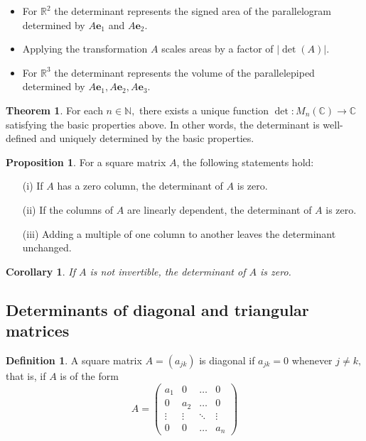 \documentclass[12pt, a4paper]{article}
\theoremstyle{definition}
\newtheorem{definition}{Definition}[section]
\newtheorem{theorem}{Theorem}[section]
\newtheorem{proposition}{Proposition}
\theoremstyle{plain}
\newtheorem{corollary}{Corollary}[theorem]
\newcommand{\bb}[1]{\mathbb{#1}}
\newcommand{\vect}[1]{\mathbf{#1}}
\begin{document}
\begin{itemize}

	\item For $\bb{R}^2$ the determinant represents the signed area of the parallelogram determined by $A\vect{e}_1$ and $A\vect{e}_2$.

	\item Applying the transformation $A$ scales areas by a factor of $|\det{(A)}|.$

	\item For $\bb{R}^3$ the determinant represents the volume of the parallelepiped determined by $A\vect{e}_1, A\vect{e}_2, A\vect{e}_3.$

\end{itemize}

\begin{theorem} For each $n \in \bb{N},$ there exists a unique function $\det : M_n(\bb{C}) \rightarrow \bb{C}$ satisfying the basic properties above. In other words, the determinant is well-defined and uniquely determined by the basic properties. \end{theorem}

\begin{proposition}
For a square matrix $A$, the following statements hold:

\begin{enumerate}
	
	\item[(i)] If $A$ has a zero column, the determinant of $A$ is zero.
	\item[(ii)] If the columns of $A$ are linearly dependent, the determinant of $A$ is zero.
	\item[(iii)] Adding a multiple of one column to another leaves the determinant unchanged.

\end{enumerate}
\end{proposition}

\begin{corollary} If $A$ is not invertible, the determinant of $A$ is zero. \end{corollary}

\subsection{Determinants of diagonal and triangular matrices}

\begin{definition} A square matrix $A = (a_{jk})$ is diagonal if $a_{jk} = 0$ whenever $j\neq k,$ that is, if $A$ is of the form 
$$A=\begin{pmatrix} 
a_1 & 0 & \ldots & 0 \\  
0 & a_2 & \ldots & 0 \\
\vdots & \vdots & \ddots & \vdots \\
0 & 0 & \ldots & a_n
\end{pmatrix}$$
\end{definition}
\end{document}

